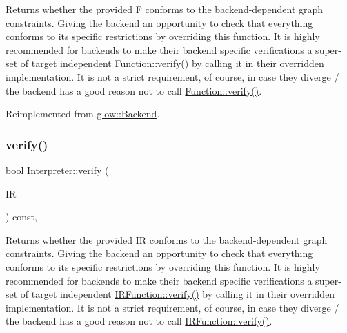 \begin{DoxyReturn}{Returns}
whether the provided {\ttfamily F} conforms to the backend-\/dependent graph constraints. Giving the backend an opportunity to check that everything conforms to its specific restrictions by overriding this function. It is highly recommended for backends to make their backend specific verifications a super-\/set of target independent \hyperlink{classglow_1_1_function_a73897a61138cf69eacb41357839815df}{Function\+::verify()} by calling it in their overridden implementation. It is not a strict requirement, of course, in case they diverge / the backend has a good reason not to call \hyperlink{classglow_1_1_function_a73897a61138cf69eacb41357839815df}{Function\+::verify()}. 
\end{DoxyReturn}


Reimplemented from \hyperlink{classglow_1_1_backend_a868ff3dc24281eba5900c3ad84baef1b}{glow\+::\+Backend}.

\mbox{\label{classglow_1_1_interpreter_a2e26be458097546c6bbcdaf59e8f493b}} 
\subsubsection{\texorpdfstring{verify()}{verify()}\hspace{0.1cm}{\footnotesize\ttfamily [2/2]}}
{\footnotesize\ttfamily bool Interpreter\+::verify (\begin{DoxyParamCaption}\item[{const \hyperlink{classglow_1_1_i_r_function}{I\+R\+Function} \&}]{IR }\end{DoxyParamCaption}) const\hspace{0.3cm}{\ttfamily [override]}, {\ttfamily [virtual]}}

\begin{DoxyReturn}{Returns}
whether the provided {\ttfamily IR} conforms to the backend-\/dependent graph constraints. Giving the backend an opportunity to check that everything conforms to its specific restrictions by overriding this function. It is highly recommended for backends to make their backend specific verifications a super-\/set of target independent \hyperlink{classglow_1_1_i_r_function_a3add272c76243daef4950bf3ff68338c}{I\+R\+Function\+::verify()} by calling it in their overridden implementation. It is not a strict requirement, of course, in case they diverge / the backend has a good reason not to call \hyperlink{classglow_1_1_i_r_function_a3add272c76243daef4950bf3ff68338c}{I\+R\+Function\+::verify()}. 
\end{DoxyReturn}



